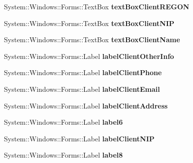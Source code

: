 \begin{DoxyCompactItemize}
System\+::\+Windows\+::\+Forms\+::\+Text\+Box {\bfseries text\+Box\+Client\+R\+E\+G\+ON}
\item 
\hypertarget{class_magazyn_1_1_magazin_a0eccd832f255df7ec15d21f19287aff9}{}\label{class_magazyn_1_1_magazin_a0eccd832f255df7ec15d21f19287aff9} 
System\+::\+Windows\+::\+Forms\+::\+Text\+Box {\bfseries text\+Box\+Client\+N\+IP}
\item 
\hypertarget{class_magazyn_1_1_magazin_a3130b59e7276b24c821bf76ffa3dedc8}{}\label{class_magazyn_1_1_magazin_a3130b59e7276b24c821bf76ffa3dedc8} 
System\+::\+Windows\+::\+Forms\+::\+Text\+Box {\bfseries text\+Box\+Client\+Name}
\item 
\hypertarget{class_magazyn_1_1_magazin_ac17b9efa22aa7e33efb65386a92e11db}{}\label{class_magazyn_1_1_magazin_ac17b9efa22aa7e33efb65386a92e11db} 
System\+::\+Windows\+::\+Forms\+::\+Label {\bfseries label\+Client\+Other\+Info}
\item 
\hypertarget{class_magazyn_1_1_magazin_ab805b3237266ee3bac5f1ebe60205d92}{}\label{class_magazyn_1_1_magazin_ab805b3237266ee3bac5f1ebe60205d92} 
System\+::\+Windows\+::\+Forms\+::\+Label {\bfseries label\+Client\+Phone}
\item 
\hypertarget{class_magazyn_1_1_magazin_aa03447dbbd479c35e3cbe2f785298e3a}{}\label{class_magazyn_1_1_magazin_aa03447dbbd479c35e3cbe2f785298e3a} 
System\+::\+Windows\+::\+Forms\+::\+Label {\bfseries label\+Client\+Email}
\item 
\hypertarget{class_magazyn_1_1_magazin_a3194e9a4d1bdab6f80130082d802e1c4}{}\label{class_magazyn_1_1_magazin_a3194e9a4d1bdab6f80130082d802e1c4} 
System\+::\+Windows\+::\+Forms\+::\+Label {\bfseries label\+Client\+Address}
\item 
\hypertarget{class_magazyn_1_1_magazin_a6cb2a8d463ab81c6b757e0892c6c6e34}{}\label{class_magazyn_1_1_magazin_a6cb2a8d463ab81c6b757e0892c6c6e34} 
System\+::\+Windows\+::\+Forms\+::\+Label {\bfseries label6}
\item 
\hypertarget{class_magazyn_1_1_magazin_aefa936552062e4c8d9c988fa55812d64}{}\label{class_magazyn_1_1_magazin_aefa936552062e4c8d9c988fa55812d64} 
System\+::\+Windows\+::\+Forms\+::\+Label {\bfseries label\+Client\+N\+IP}
\item 
\hypertarget{class_magazyn_1_1_magazin_aff287cf8e2fed8e9af78aa13ea69a8f3}{}\label{class_magazyn_1_1_magazin_aff287cf8e2fed8e9af78aa13ea69a8f3} 
System\+::\+Windows\+::\+Forms\+::\+Label {\bfseries label8}
\item 
\hypertarget{class_magazyn_1_1_magazin_a8e958232233aa7feda2ffdc7cc64899f}{}\label{class_magazyn_1_1_magazin_a8e958232233aa7feda2ffdc7cc64899f} 

\end{DoxyCompactItemize}
